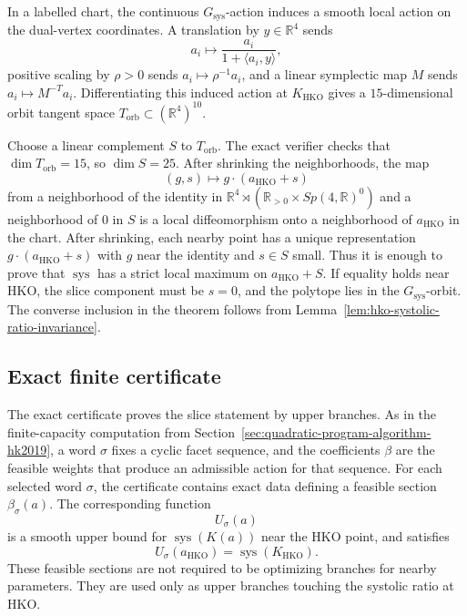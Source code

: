 In a labelled chart, the continuous \(G_{\operatorname{sys}}\)-action induces
a smooth local action on the dual-vertex coordinates. A translation by
\(y\in\mathbb R^4\) sends
\[
  a_i\mapsto \frac{a_i}{1+\langle a_i,y\rangle},
\]
positive scaling by \(\rho>0\) sends \(a_i\mapsto \rho^{-1}a_i\), and a
linear symplectic map \(M\) sends \(a_i\mapsto M^{-T}a_i\). Differentiating
this induced action at \(K_{\mathrm{HKO}}\) gives a \(15\)-dimensional
orbit tangent space \(T_{\mathrm{orb}}\subset(\mathbb R^4)^{10}\).

Choose a linear complement \(S\) to \(T_{\mathrm{orb}}\). The exact verifier
checks that \(\dim T_{\mathrm{orb}}=15\), so \(\dim S=25\). After shrinking the
neighborhoods, the map
\[
  (g,s)\longmapsto g\cdot(a_{\mathrm{HKO}}+s)
\]
from a neighborhood of the identity in
\(\mathbb R^4\rtimes(\mathbb R_{>0}\times Sp(4,\mathbb R)^0)\) and a
neighborhood of \(0\) in \(S\) is a local diffeomorphism onto a neighborhood of
\(a_{\mathrm{HKO}}\) in the chart. After shrinking, each nearby point has a
unique representation \(g\cdot(a_{\mathrm{HKO}}+s)\) with \(g\) near the
identity and \(s\in S\) small. Thus it is enough to prove that
\(\operatorname{sys}\) has a strict local maximum on \(a_{\mathrm{HKO}}+S\). If
equality holds near HKO, the slice component must be \(s=0\), and the polytope
lies in the \(G_{\operatorname{sys}}\)-orbit. The converse inclusion in the
theorem follows from Lemma~\ref{lem:hko-systolic-ratio-invariance}.

\subsection{Exact finite certificate}
\label{subsec:hko-local-maximum-computation-with-sagemath}

The exact certificate proves the slice statement by upper branches. As in the
finite-capacity computation from
Section~\ref{sec:quadratic-program-algorithm-hk2019}, a word \(\sigma\) fixes
a cyclic facet sequence, and the coefficients \(\beta\) are the feasible
weights that produce an admissible action for that sequence. For each selected
word \(\sigma\), the certificate contains exact data defining a feasible
section \(\beta_\sigma(a)\). The corresponding function
\[
  U_\sigma(a)
\]
is a smooth upper bound for \(\operatorname{sys}(K(a))\) near the HKO point,
and satisfies
\[
  U_\sigma(a_{\mathrm{HKO}})
  =
  \operatorname{sys}(K_{\mathrm{HKO}}).
\]
These feasible sections are not required to be optimizing branches for nearby
parameters. They are used only as upper branches touching the systolic ratio
at HKO.

